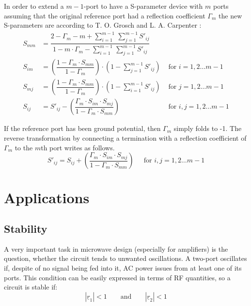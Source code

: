 In order to extend a $m - 1$-port to have a S-parameter device with
$m$ ports assuming that the original reference port had a reflection
coefficient $\Gamma_m$ the new S-parameters are according to
T. O. Grosch and L. A. Carpenter \cite{Grosch}:
\begin{align}
S_{mm} &= \dfrac{2 - \Gamma_m - m + {\displaystyle\sum_{i=1}^{m-1}}\, {\displaystyle\sum_{j=1}^{m-1}} S'_{ij}}{1 - m\cdot \Gamma_m - {\displaystyle\sum_{i=1}^{m-1}}\, {\displaystyle\sum_{j=1}^{m-1}} S'_{ij}}\\
S_{im} &= \left(\dfrac{1 - \Gamma_m\cdot S_{mm}}{1 - \Gamma_m}\right)\cdot \left(1 - \sum_{j=1}^{m-1} S'_{ij}\right) &
\textrm{ for } i = 1,2 \ldots m - 1\\
S_{mj} &= \left(\dfrac{1 - \Gamma_m\cdot S_{mm}}{1 - \Gamma_m}\right)\cdot \left(1 - \sum_{i=1}^{m-1} S'_{ij}\right) &
\textrm{ for } j = 1,2 \ldots m - 1\\
S_{ij} &= S'_{ij} - \left(\dfrac{\Gamma_m\cdot S_{im}\cdot S_{mj}}{1 - \Gamma_m\cdot S_{mm}}\right) &
\textrm{ for } i,j = 1,2 \ldots m - 1
\end{align}

If the reference port has been ground potential, then $\Gamma_m$
simply folds to -1.  The reverse transformation by connecting a
termination with a reflection coefficient of $\Gamma_m$ to the $m$th
port writes as follows.
\begin{equation}
S'_{ij} = S_{ij} + \left(\dfrac{\Gamma_m\cdot S_{im}\cdot S_{mj}}{1 - \Gamma_m\cdot S_{mm}}\right)
\;\;\;\; \textrm{ for } i,j = 1,2 \ldots m - 1
\end{equation}

\section{Applications}

\subsection{Stability}

A very important task in microwave design (especially for amplifiers)
is the question, whether the circuit tends to unwanted oscillations.
A two-port oscillates if, despite of no signal being fed into it, AC
power issues from at least one of its ports.  This condition can be
easily expressed in terms of RF quantities, so a circuit is stable
if:
\begin{equation}
|\underline{r}_1| < 1  \qquad \text{and} \qquad  |\underline{r}_2| < 1
\end{equation}

